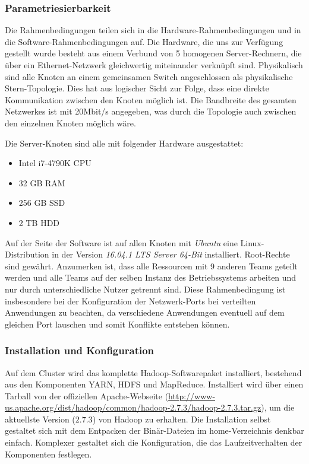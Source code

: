 \subsubsection{Parametriesierbarkeit}
\label{anforderungen:rahmenbedingungen}
Die Rahmenbedingungen teilen sich in die Hardware-Rahmenbedingungen und in die Software-Rahmenbedingungen auf.
Die Hardware, die uns zur Verfügung gestellt wurde besteht aus einem Verbund von 5 homogenen Server-Rechnern, 
die über ein Ethernet-Netzwerk gleichwertig miteinander verknüpft sind. Physikalisch sind alle Knoten an einem gemeinsamen
Switch angeschlossen als physikalische Stern-Topologie. Dies hat aus logischer Sicht zur Folge, dass eine direkte Kommunikation
zwischen den Knoten möglich ist. Die Bandbreite des gesamten Netzwerkes ist mit 20Mbit/s angegeben, was durch die Topologie
auch zwischen den einzelnen Knoten möglich wäre.

Die Server-Knoten sind alle mit folgender Hardware ausgestattet:
\begin{itemize}
	\item Intel i7-4790K CPU
	\item 32 GB RAM
	\item 256 GB SSD
	\item 2 TB HDD
\end{itemize}

Auf der Seite der Software ist auf allen Knoten mit \textit{Ubuntu} eine Linux-Distribution in der Version 
\textit{16.04.1 LTS Server 64-Bit} installiert. Root-Rechte sind gewährt.
Anzumerken ist, dass alle Ressourcen mit 9 anderen Teams geteilt werden und alle Teams auf der selben 
Instanz des Betriebssystems arbeiten und nur durch unterschiedliche Nutzer getrennt sind. 
Diese Rahmenbedingung ist insbesondere bei der Konfiguration der Netzwerk-Ports bei verteilten Anwendungen 
zu beachten, da verschiedene Anwendungen eventuell auf dem gleichen Port lauschen und somit 
Konflikte entstehen können.

\subsubsection{Installation und Konfiguration}
Auf dem Cluster wird das komplette Hadoop-Softwarepaket installiert, bestehend aus den
Komponenten \ac{YARN}, \ac{HDFS} und MapReduce. Installiert wird über einen Tarball von der offiziellen
Apache-Webseite (\url{http://www-us.apache.org/dist/hadoop/common/hadoop-2.7.3/hadoop-2.7.3.tar.gz}), um die aktuellste Version ($2.7.3$) von Hadoop zu erhalten. Die Installation selbst gestaltet sich mit dem Entpacken der Binär-Dateien im home-Verzeichnis 
denkbar einfach. Komplexer gestaltet sich die Konfiguration, die das Laufzeitverhalten der Komponenten festlegen.

